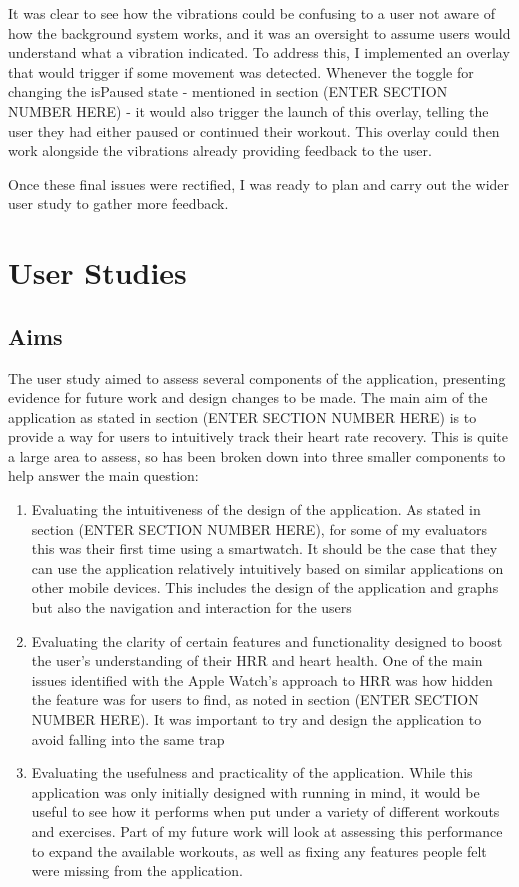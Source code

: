 \documentclass{l4proj}
\begin{document}
It was clear to see how the vibrations could be confusing to a user not aware of how the background system works, and it was an oversight to assume users would understand what a vibration indicated. To address this, I implemented an overlay that would trigger if some movement was detected. Whenever the toggle for changing the isPaused state - mentioned in section (ENTER SECTION NUMBER HERE) - it would also trigger the launch of this overlay, telling the user they had either paused or continued their workout. This overlay could then work alongside the vibrations already providing feedback to the user.

Once these final issues were rectified, I was ready to plan and carry out the wider user study to gather more feedback.

\section{User Studies}

\subsection{Aims}

The user study aimed to assess several components of the application, presenting evidence for future work and design changes to be made. The main aim of the application as stated in section (ENTER SECTION NUMBER HERE) is to provide a way for users to intuitively track their heart rate recovery. This is quite a large area to assess, so has been broken down into three smaller components to help answer the main question:

\begin{enumerate}
    \item Evaluating the intuitiveness of the design of the application. As stated in section (ENTER SECTION NUMBER HERE), for some of my evaluators this was their first time using a smartwatch. It should be the case that they can use the application relatively intuitively based on similar applications on other mobile devices. This includes the design of the application and graphs but also the navigation and interaction for the users
    \item Evaluating the clarity of certain features and functionality designed to boost the user's understanding of their HRR and heart health. One of the main issues identified with the Apple Watch’s approach to HRR was how hidden the feature was for users to find, as noted in section (ENTER SECTION NUMBER HERE). It was important to try and design the application to avoid falling into the same trap
    \item Evaluating the usefulness and practicality of the application. While this application was only initially designed with running in mind, it would be useful to see how it performs when put under a variety of different workouts and exercises. Part of my future work will look at assessing this performance to expand the available workouts, as well as fixing any features people felt were missing from the application.
\end{enumerate}
\end{document}
